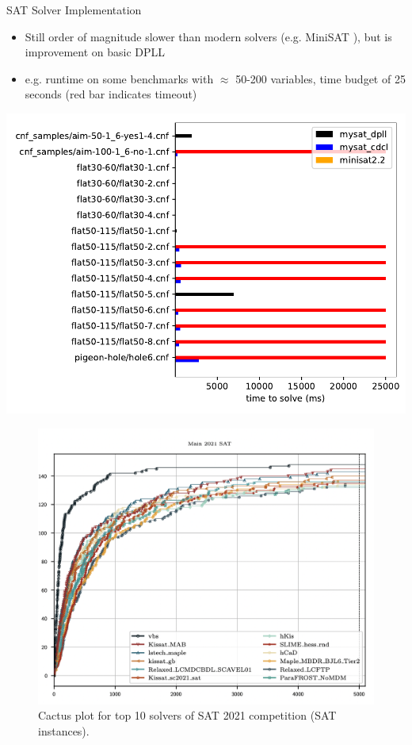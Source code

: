 \documentclass{beamer}
\begin{document}
\begin{frame}{SAT Solver Implementation}
    \begin{itemize}
        \item Still order of magnitude slower than modern solvers (e.g. MiniSAT \cite{04minisat}), but is improvement on basic DPLL
        \pause
        \item e.g. runtime on some benchmarks with $\approx$ 50-200 variables, time budget of 25 seconds (red bar indicates timeout)
    \end{itemize}
    \begin{center}
        \includegraphics[scale=0.45]{../../results/compare.pdf}
    \end{center}
\end{frame}

\begin{frame}
    \begin{figure}
        \includegraphics[scale=0.35]{figures/sat2021-main.png}
        \caption{Cactus plot for top 10 solvers of SAT 2021 competition (SAT instances).}
    \end{figure}
\end{frame}
\end{document}
